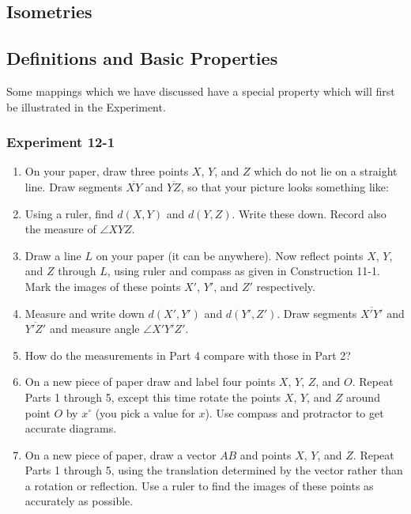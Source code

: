 \documentclass[12pt]{book} %
\begin{document}
\begin{ExerciseList}
\chapter{Isometries}

\section{Definitions and Basic Properties}

Some mappings which we have discussed have a special property which will first be illustrated in the Experiment.

\subsection*{Experiment 12-1}

\begin{enumerate}
\item On your paper, draw three points $X$, $Y$, and $Z$ which do not lie on a straight line. Draw segments $\overline{XY}$ and $\overline{YZ}$, so that your picture looks something like:


\item Using a ruler, find $d(X,Y)$ and $d(Y,Z)$. Write these down. Record also the measure of $\angle XYZ$.

\item Draw a line $L$ on your paper (it can be anywhere). Now reflect points $X$, $Y$, and $Z$ through $L$, using ruler and compass as given in Construction 11-1. Mark the images of these points $X'$, $Y'$, and $Z'$ respectively.

\item Measure and write down $d(X',Y')$ and $d(Y',Z')$. Draw segments $\overline{X'Y'}$ and $\overline{Y'Z'}$ and measure angle $\angle X'Y'Z'$.

\item How do the measurements in Part 4 compare with those in Part 2?

\item On a new piece of paper draw and label four points $X$, $Y$, $Z$, and $O$. Repeat Parts 1 through 5, except this time rotate the points $X$, $Y$, and $Z$ around point $O$ by $x^\circ$ (you pick a value for $x$). Use compass and protractor to get accurate diagrams.

\item On a new piece of paper, draw a vector $AB$ and points $X$, $Y$, and $Z$. Repeat Parts 1 through 5, using the translation determined by the vector rather than a rotation or reflection. Use a ruler to find the images of these points as accurately as possible.


\end{enumerate}
\end{ExerciseList}
\end{document}

